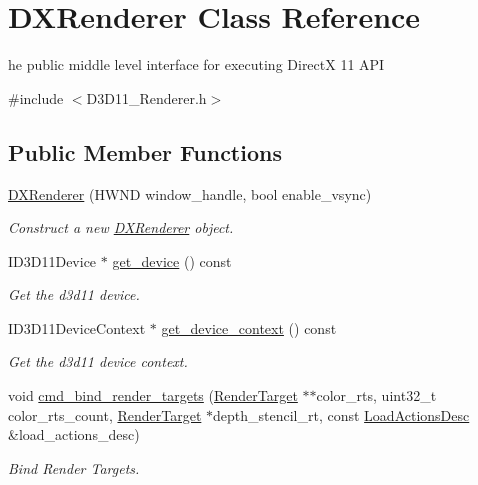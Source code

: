 \hypertarget{classDXRenderer}{}\section{D\+X\+Renderer Class Reference}
\label{classDXRenderer}


he public middle level interface for executing DirectX 11 A\+PI  




{\ttfamily \#include $<$D3\+D11\+\_\+\+Renderer.\+h$>$}

\subsection*{Public Member Functions}
\begin{DoxyCompactItemize}
\item 
\hyperlink{classDXRenderer_a523a1ab5a6f1031bda1242fb105241b7}{D\+X\+Renderer} (H\+W\+ND window\+\_\+handle, bool enable\+\_\+vsync)
\begin{DoxyCompactList}\small\item\em Construct a new \hyperlink{classDXRenderer}{D\+X\+Renderer} object. \end{DoxyCompactList}\item 
I\+D3\+D11\+Device $\ast$ \hyperlink{classDXRenderer_a93e38bbc88225a3244e336974674774b}{get\+\_\+device} () const
\begin{DoxyCompactList}\small\item\em Get the d3d11 device. \end{DoxyCompactList}\item 
I\+D3\+D11\+Device\+Context $\ast$ \hyperlink{classDXRenderer_ada893f000ff5b8bd2b0f24539f6be420}{get\+\_\+device\+\_\+context} () const
\begin{DoxyCompactList}\small\item\em Get the d3d11 device context. \end{DoxyCompactList}\item 
void \hyperlink{classDXRenderer_a668f61d8e8ccad71f0f623c4fe05bb4e}{cmd\+\_\+bind\+\_\+render\+\_\+targets} (\hyperlink{classRenderTarget}{Render\+Target} $\ast$$\ast$color\+\_\+rts, uint32\+\_\+t color\+\_\+rts\+\_\+count, \hyperlink{classRenderTarget}{Render\+Target} $\ast$depth\+\_\+stencil\+\_\+rt, const \hyperlink{structLoadActionsDesc}{Load\+Actions\+Desc} \&load\+\_\+actions\+\_\+desc)
\begin{DoxyCompactList}\small\item\em Bind Render Targets. \end{DoxyCompactList}\item 
$$
\end{DoxyCompactItemize}

